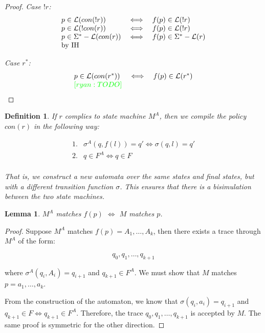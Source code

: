 \documentclass[twocolumn]{sig-alternate-10pt}
\newcommand{\ryan}[1]{\textcolor{green}{[ryan: #1]}}
\newtheorem{defn}{Definition}
\newtheorem{lem}[thm]{Lemma}
\begin{document}
\begin{proof}
\emph{Case $!r$:}
  \[ \begin{array}{lll}
    p \in \mathcal{L}(con(!r)) &\iff& f(p) \in \mathcal{L}(!r) \\
    p \in \mathcal{L}(!con(r)) &\iff& f(p) \in \mathcal{L}(!r) \\
    p \in \Sigma^* - \mathcal{L}(con(r)) &\iff& f(p) \in \Sigma^* - \mathcal{L}(r) \\
    \text{by IH} & & \\
  \end{array} \]

\emph{Case $r^*$:}
  \[ \begin{array}{lll}
    p \in \Lang(con(r^*)) &\iff& f(p) \in \Lang(r^*) \\
    \ryan{TODO} & & \\
  \end{array} \]

\end{proof}



\begin{defn}
If $r$ complies to state machine $M^A$, then we compile the policy $con(r)$ in the following way:

  \[ \begin{array}{ll}
    1. & \sigma^A(q,f(l)) = q' \iff \sigma(q,l) = q' \\
    2. & q \in F^A \iff q \in F \\
  \end{array} \]

That is, we construct a new automata over the same states and final states, but with a different transition function $\sigma$. This ensures that there is a bisimulation between the two state machines.

\end{defn}


\begin{lem}
  $M^A$ matches $f(p)$ $\iff$ $M$ matches $p$.
\end{lem}

\begin{proof}
  Suppose $M^A$ matches $f(p) = A_1, \dots, A_k$, then there exists a trace through $M^A$ of the form:

  $$q_0, q_1, \dots, q_{k+1}$$

  where $\sigma^A(q_i, A_i) = q_{i+1}$ and $q_{k+1} \in F^A$. We must show that $M$ matches $p = a_1, \dots, a_k$. 

  From the construction of the automaton, we know that $\sigma(q_i, a_i) = q_{i+1}$ and $q_{k+1} \in F \iff q_{k+1} \in F^A$. Therefore, the trace $q_0, q_1, \dots, q_{k+1}$ is accepted by $M$. 
  The same proof is symmetric for the other direction.
\end{proof}
\end{document}
